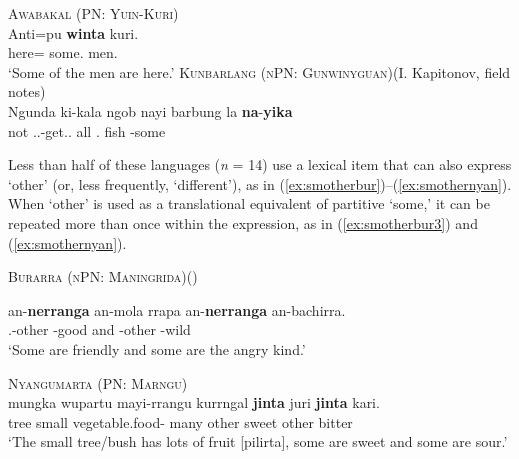 \documentclass[12pt,egregdoesnotlikesansseriftitles]{scrartcl}
\begin{document}
\begin{exe}
  \ex\label{ex:specsmawa} \textsc{Awabakal (PN: Yuin-Kuri)}\hfill {}\\
  \gll Anti=pu \textbf{winta} kuri.\\
  here=\Excl{} some.\Abs{} men.\Abs\\
  \glt `Some of the men are here.' %
  \ex\label{ex:specsmwlg} \textsc{Kunbarlang (nPN: Gunwinyguan)}\hfill (I. Kapitonov, field notes)\\
  {\gll Ngunda ki-kala ngob nayi barbung la \textbf{na}-\textbf{yika}\\
  not \Tsg.\Irr.\Pst-get.\Irr.\Pst{} all \Nm.\Cli{} fish \Conj{} \Cli-some\\}
\end{exe}

Less than half of these languages (\textit{n} = 14) use a lexical item that can also express `other' (or, less frequently, `different'),  as in (\ref{ex:smotherbur})--(\ref{ex:smothernyan}). When `other' is used as a translational equivalent of partitive `some,' it can be repeated more than once within the expression, as in (\ref{ex:smotherbur3}) and (\ref{ex:smothernyan}).
\begin{exe}
  \ex\label{ex:smotherbur} \textsc{Burarra (nPN: Maningrida)}\hfill (\citealt{green87})
  \begin{xlist}
    \ex \gll an-\textbf{nerranga} an-mola  rrapa  an-\textbf{nerranga}  an-bachirra.\\
    \Third.\Min-other \Third\Min-good and \Third\Min-other \Third\Min-wild\\
    \glt `Some are friendly and some are the angry kind.' \label{ex:smotherbur3}
  \end{xlist}
  \ex\label{ex:smothernyan} \textsc{Nyangumarta (PN: Marngu)}\hfill {}\\
  \gll mungka wupartu mayi-rrangu kurrngal \textbf{jinta} juri \textbf{jinta} kari.\\
  tree  small vegetable.food-\Pl{} many other sweet other bitter\\
  \glt `The small tree/bush has lots of fruit [pilirta], some are sweet and some are sour.'
\end{exe}
\end{document}
